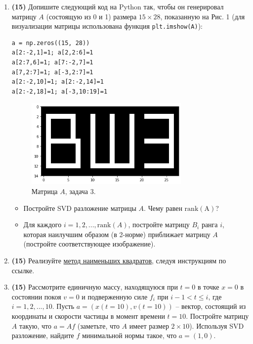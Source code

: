 \documentclass[prb,papersize=a4paper,notitlepage]{revtex4-1}%
\begin{document}
\begin{enumerate}
\item \textbf{(15)} Допишите следующий код на Python так, чтобы он генерировал матрицу $A$ (состоящую из 0 и 1) размера $15\times 28$, показанную на Рис. 1 (для визуализации матрицы использована функция \lstinline{plt.imshow(A)}):
\lstset{language=Python}
\lstset{frame=lines}
\lstset{basicstyle=\ttfamily}
\begin{lstlisting}
a = np.zeros((15, 28))
a[2:-2,1]=1; a[2,2:6]=1
a[2:7,6]=1; a[7:-2,7]=1
a[7,2:7]=1; a[-3,2:7]=1
a[2:-2,10]=1; a[2:-2,14]=1 
a[2:-2,18]=1; a[-3,10:19]=1
\end{lstlisting}
\begin{figure}[h!]
\includegraphics[width=8cm]{hse.png}
\caption{Матрица $A$, задача 3.}
\label{subs}
\end{figure}
\begin{itemize}
\item Постройте SVD разложение матрицы $A$. Чему равен $\mathrm{rank(A)}$?
\item Для каждого $i=1,2,...,\mathrm{rank}(A)$, постройте матрицу $B_i$ ранга $i$, которая наилучшим образом (в 2-норме) приближает матрицу $A$ (постройте соответствующее изображение). 
\end{itemize}

\item \textbf{(15)} Реализуйте \href{https://github.com/ev-br/CP2020/blob/master/week_3_lsq.ipynb}{метод наименьших квадратов}, следуя инструкциям по ссылке.

\item \textbf{(15)} 
Рассмотрите единичную массу, находящуюся при $t=0$ в точке $x=0$ в состоянии покоя $v=0$ и подверженную силе $f_i$ при $i-1< t \le i$, где $i=1,2,...,10$. Пусть $a=(x(t=10),v(t=10))$ -- вектор, состоящий из координаты и скорости частицы в момент времени $t=10$. Постройте матрицу $A$ такую, что $a=Af$ (заметьте, что $A$ имеет размер $2\times 10$). Используя SVD разложение, найдите $f$ минимальной нормы такое, что $a=(1,0)$.
\end{enumerate}
\end{document}

